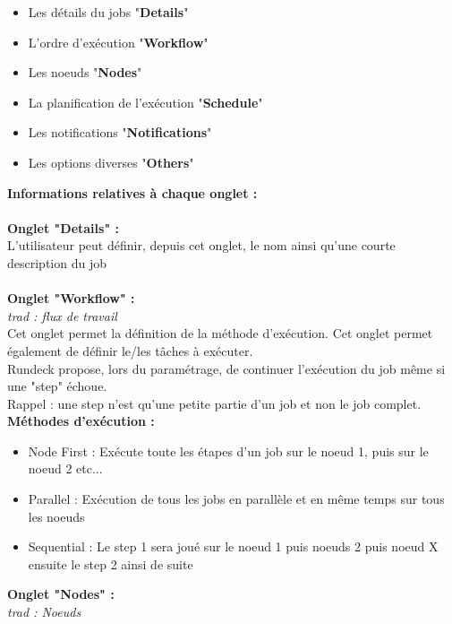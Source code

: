 \documentclass[12pt]{article}
\begin{document}
\begin{itemize}
    \item Les détails du jobs "\textbf{Details}"
    \item L'ordre d'exécution "\textbf{Workflow}"
    \item Les noeuds "\textbf{Nodes}"
    \item La planification de l'exécution "\textbf{Schedule}"
    \item Les notifications "\textbf{Notifications}"
    \item Les options diverses "\textbf{Others}"
\end{itemize}
\vspace{0.5cm}
\textbf{Informations relatives à chaque onglet :}
\\
\vspace{0.5cm}
\\
\textbf{Onglet "Details" :}
\\
L'utilisateur peut définir, depuis cet onglet, le nom ainsi qu'une courte description du job
\\
\vspace{0.2cm}
\\
\textbf{Onglet "Workflow" :}
\\
\textit{trad : flux de travail}
\\
Cet onglet permet la définition de la méthode d'exécution. Cet onglet permet également de définir le/les tâches à exécuter.
\\
Rundeck propose, lors du paramétrage, de continuer l'exécution du job même si une "step" échoue. 
\\
Rappel : une step n'est qu'une petite partie d'un job et non le job complet.
\vspace{0.5cm}
\\
\textbf{Méthodes d'exécution :}
\begin{itemize}
    \item Node First : Exécute toute les étapes d'un job sur le noeud 1, puis sur le noeud 2 etc...
    \item Parallel : Exécution de tous les jobs en parallèle et en même temps sur tous les noeuds
    \item Sequential : Le step 1 sera joué sur le noeud 1 puis noeuds 2 puis noeud X ensuite le step 2 ainsi de suite
\end{itemize}
\vspace{0.2cm}
\textbf{Onglet "Nodes" :}
\\
\textit{trad : Noeuds}
\\
\end{document}
